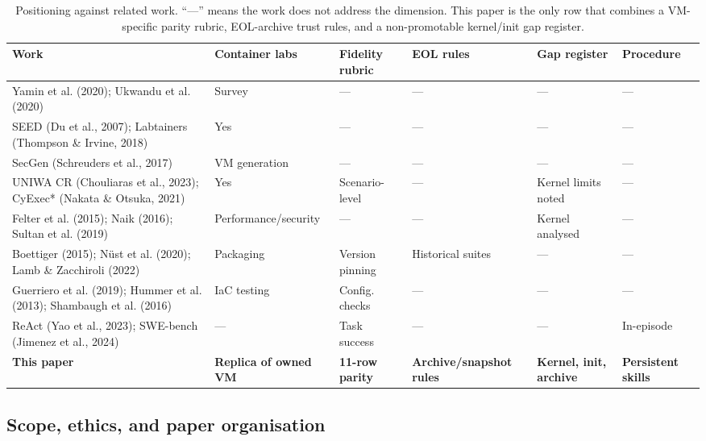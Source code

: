 \documentclass[3p,twocolumn,authoryear]{elsarticle}
\begin{document}
\begin{table}[tbp]
\caption{Positioning against related work. ``---'' means the work does
not address the dimension. This paper is the only row that combines a
VM-specific parity rubric, EOL-archive trust rules, and a
non-promotable kernel/init gap register.}
\label{tab:related}
\centering\footnotesize
\begin{tabularx}{\textwidth}{>{\raggedright\arraybackslash}X>{\centering\arraybackslash}X>{\centering\arraybackslash}X>{\centering\arraybackslash}X>{\centering\arraybackslash}X>{\centering\arraybackslash}X}
\toprule
Work & Container labs & Fidelity rubric & EOL rules & Gap register & Procedure\\
\midrule
Yamin et al. (2020); Ukwandu et al. (2020) & Survey & --- & --- & --- & ---\\
SEED (Du et al., 2007); Labtainers (Thompson \& Irvine, 2018) & Yes & --- & --- & --- & ---\\
SecGen (Schreuders et al., 2017) & VM generation & --- & --- & --- & ---\\
UNIWA CR (Chouliaras et al., 2023); CyExec* (Nakata \& Otsuka, 2021) & Yes & Scenario-level & --- & Kernel limits noted & ---\\
Felter et al. (2015); Naik (2016); Sultan et al. (2019) & Performance\slash security & --- & --- & Kernel analysed & ---\\
Boettiger (2015); N\"ust et al. (2020); Lamb \& Zacchiroli (2022) & Packaging & Version pinning & Historical suites & --- & ---\\
Guerriero et al. (2019); Hummer et al. (2013); Shambaugh et al. (2016) & IaC testing & Config. checks & --- & --- & ---\\
ReAct (Yao et al., 2023); SWE-bench (Jimenez et al., 2024) & --- & Task success & --- & --- & In-episode\\
\textbf{This paper} & \textbf{Replica of owned VM} & \textbf{11-row parity} & \textbf{Archive\slash snapshot rules} & \textbf{Kernel, init, archive} & \textbf{Persistent skills}\\
\bottomrule
\end{tabularx}
\end{table}

\subsection{Scope, ethics, and paper organisation}
\end{document}
